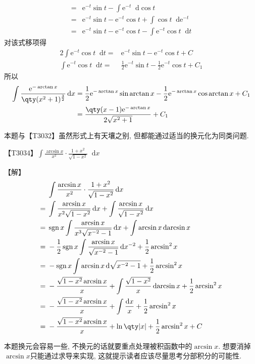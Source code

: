 \documentclass{ctexbook}
\DeclareMathOperator{\sgn}{sgn}
\newcommand{\e}{\mathrm{e}}
\newcommand*{\dif}{\mathop{}\!\mathrm{d}}
\begin{document}
{\begin{align*}
={}&\e^{-t}\sin{t}-\int\e^{-t}\dif{\cos{t}}\\
={}&\e^{-t}\sin{t}-\e^{-t}\cos{t}+\int\cos{t}\dif{\e^{-t}}\\
={}&\e^{-t}\sin{t}-\e^{-t}\cos{t}-\int\e^{-t}\cos{t}\dif{t}
\end{align*}
对该式移项得
\begin{align*}
2\int\e^{-t}\cos{t}\dif{t}={}&\e^{-t}\sin{t}-\e^{-t}\cos{t}+C\\
\int\e^{-t}\cos{t}\dif{t}={}&\frac{1}{2}\e^{-t}\sin{t}-\frac{1}{2}\e^{-t}\cos{t}+C_{1}
\end{align*}
所以
\begin{align*}
\int\frac{\e^{-\arctan{x}}}{\qty(x^{2}+1)^{\frac{3}{2}}}\dif{x}={}&\frac{1}{2}\e^{-\arctan{x}}\sin{\arctan{x}}-\frac{1}{2}\e^{-\arctan{x}}\cos{\arctan{x}}+C_{1}\\
={}&\frac{\qty(x-1)\e^{-\arctan{x}}}{2\sqrt{x^{2}+1}}+C_{1}
\end{align*}\par
{\kaishu 本题与{\color{red}【T3032】}虽然形式上有天壤之别, 但都能通过适当的换元化为同类问题. \par}
【T3034】$\int\frac{\arcsin{x}}{x^{2}}\cdot\frac{1+x^{2}}{\sqrt{1-x^{2}}}\dif{x}$\par
【解】
\begin{align*}
{}&\int\frac{\arcsin{x}}{x^{2}}\cdot\frac{1+x^{2}}{\sqrt{1-x^{2}}}\dif{x}\\
={}&\int\frac{\arcsin{x}}{x^{2}\sqrt{1-x^{2}}}\dif{x}+\int\frac{\arcsin{x}}{\sqrt{1-x^{2}}}\dif{x}\\
={}&\sgn{x}\int\frac{\arcsin{x}}{x^{3}\sqrt{x^{-2}-1}}\dif{x}+\int\arcsin{x}\dif{\arcsin{x}}\\
={}&-\frac{1}{2}\sgn{x}\int\frac{\arcsin{x}}{\sqrt{x^{-2}-1}}\dif{x^{-2}}+\frac{1}{2}\arcsin^{2}{x}\\
={}&-\sgn{x}\int\arcsin{x}\dif{\sqrt{x^{-2}-1}}+\frac{1}{2}\arcsin^{2}{x}\\
={}&-\frac{\sqrt{1-x^{2}}\arcsin{x}}{x}+\int\frac{\sqrt{1-x^{2}}}{x}\dif{\arcsin{x}}+\frac{1}{2}\arcsin^{2}{x}\\
={}&-\frac{\sqrt{1-x^{2}}\arcsin{x}}{x}+\int\frac{\dif{x}}{x}+\frac{1}{2}\arcsin^{2}{x}\\
={}&-\frac{\sqrt{1-x^{2}}\arcsin{x}}{x}+\ln\qty|x|+\frac{1}{2}\arcsin^{2}{x}+C
\end{align*}\par
{\kaishu 本题换元会容易一些, 不换元的话就要重点处理被积函数中的$\arcsin{x}$. 想要消掉$\arcsin{x}$只能通过求导来实现, 这就提示读者应该尽量思考分部积分的可能性. \par}
}
\end{document}

